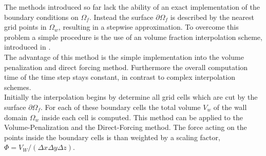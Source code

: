 The methods introduced so far lack the ability of an exact implementation of the boundary conditions on $\Omega_f$.
Instead the surface $\partial \Omega_f$ is described by the nearest grid points in $\Omega_w$, resulting in a
stepwise approximation.
To overcome this problem a simple procedure is the use of an volume fraction interpolation scheme, introduced in \citep{Fadlun2000}.\\
The advantage of this method is the simple implementation into the volume penalization and direct forcing method.
Furthermore the overall computation time of the time step stays constant, in  contrast to complex interpolation schemes.\\
Initially the interpolation begins by determine all grid cells which are cut by the surface $\partial \Omega_f$.
For each of these boundary cells the total volume $V_w$ of the wall domain $\Omega_w$ inside each cell is computed.
This method can be applied to the Volume-Penalization and the Direct-Forcing method.
The force acting on the points inside the boundary cells is than weighted by a scaling factor, $\Phi = V_W/(\Delta x \Delta y \Delta z)$.

